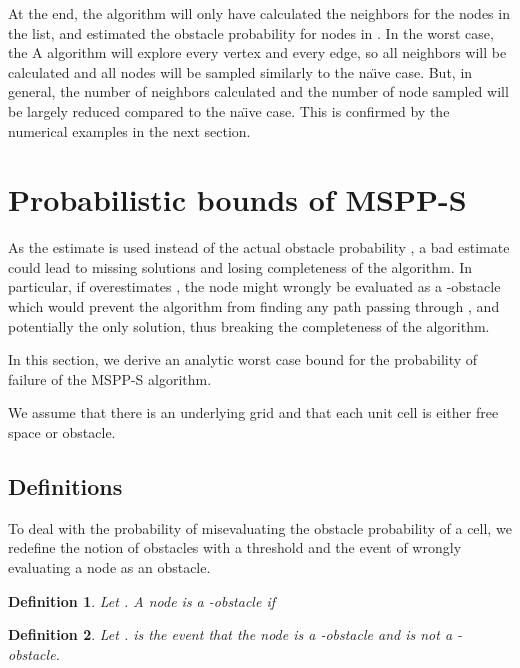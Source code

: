 \documentclass[letterpaper, 10 pt, conference]{ieeeconf}
\newtheorem{defi}{Definition}
\theoremstyle{definition}
\begin{document}
At the end, the algorithm will only have calculated the neighbors for the nodes in the  list, and estimated the obstacle probability for nodes in .
In the worst case, the A algorithm will explore every vertex and every edge, so all neighbors will be calculated and all nodes will be sampled similarly to the na\"{\i}ve case. But, in general, the number of neighbors calculated and the number of node sampled will be largely reduced compared to the na\"{\i}ve case.
This is confirmed by the numerical examples in the next section.

\section{Probabilistic bounds of MSPP-S}
As the estimate  is used instead of the actual obstacle probability , a bad estimate could lead to missing solutions and losing completeness of the algorithm. In particular, if  overestimates , the node  might wrongly be evaluated as a -obstacle which would prevent the algorithm from finding any path passing through , and potentially the only solution, thus breaking the completeness of the algorithm.

In this section, we derive an analytic worst case bound for the probability of failure of the MSPP-S algorithm.

We assume that there is an underlying grid and that each unit cell is either free space or obstacle.

\subsection{Definitions}
To deal with the probability of misevaluating the obstacle probability of a cell, we redefine the notion of obstacles with a threshold  and the event of wrongly evaluating a node as an obstacle.
\begin{defi}
Let . A node  is a -obstacle if

\end{defi}
\begin{defi}
Let .  is the event that the node  is a -obstacle and is not a -obstacle.
\end{defi}
\end{document}
